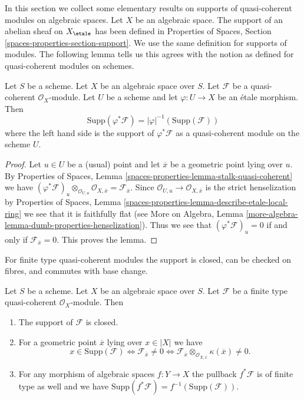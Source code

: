 \noindent
In this section we collect some elementary results on supports of
quasi-coherent modules on algebraic spaces. Let $X$ be an algebraic
space. The support of an abelian sheaf on $X_\etale$
has been defined in Properties of Spaces, Section
\ref{spaces-properties-section-support}.
We use the same definition for supports of modules.
The following lemma tells us this agrees with the notion
as defined for quasi-coherent modules on schemes.

\begin{lemma}
\label{lemma-support-covering}
Let $S$ be a scheme. Let $X$ be an algebraic space over $S$.
Let $\mathcal{F}$ be a quasi-coherent $\mathcal{O}_X$-module.
Let $U$ be a scheme and let $\varphi : U \to X$ be an \'etale morphism.
Then
$$
\text{Supp}(\varphi^*\mathcal{F}) = |\varphi|^{-1}(\text{Supp}(\mathcal{F}))
$$
where the left hand side is the support of $\varphi^*\mathcal{F}$ as a
quasi-coherent module on the scheme $U$.
\end{lemma}

\begin{proof}
Let $u\in U$ be a (usual) point and let $\overline{x}$ be a
geometric point lying over $u$. By
Properties of Spaces, Lemma \ref{spaces-properties-lemma-stalk-quasi-coherent}
we have
$(\varphi^*\mathcal{F})_u \otimes_{\mathcal{O}_{U, u}}
\mathcal{O}_{X, \overline{x}} = \mathcal{F}_{\overline{x}}$.
Since $\mathcal{O}_{U, u} \to \mathcal{O}_{X, \overline{x}}$
is the strict henselization by
Properties of Spaces, Lemma
\ref{spaces-properties-lemma-describe-etale-local-ring}
we see that it is faithfully flat (see
More on Algebra, Lemma
\ref{more-algebra-lemma-dumb-properties-henselization}).
Thus we see that $(\varphi^*\mathcal{F})_u = 0$ if and only if
$\mathcal{F}_{\overline{x}} = 0$. This proves the lemma.
\end{proof}

\noindent
For finite type quasi-coherent modules the support is closed,
can be checked on fibres, and commutes with base change.

\begin{lemma}
\label{lemma-support-finite-type}
Let $S$ be a scheme. Let $X$ be an algebraic space over $S$.
Let $\mathcal{F}$ be a finite type quasi-coherent $\mathcal{O}_X$-module.
Then
\begin{enumerate}
\item The support of $\mathcal{F}$ is closed.
\item For a geometric point $\overline{x}$ lying over $x \in |X|$ we have
$$
x \in \text{Supp}(\mathcal{F})
\Leftrightarrow
\mathcal{F}_{\overline{x}} \not = 0
\Leftrightarrow
\mathcal{F}_{\overline{x}} \otimes_{\mathcal{O}_{X, \overline{x}}}
\kappa(\overline{x}) \not = 0.
$$
\item For any morphism of algebraic spaces $f : Y \to X$ the pullback
$f^*\mathcal{F}$ is of finite type as well and we have
$\text{Supp}(f^*\mathcal{F}) = f^{-1}(\text{Supp}(\mathcal{F}))$.
\end{enumerate}
\end{lemma}


